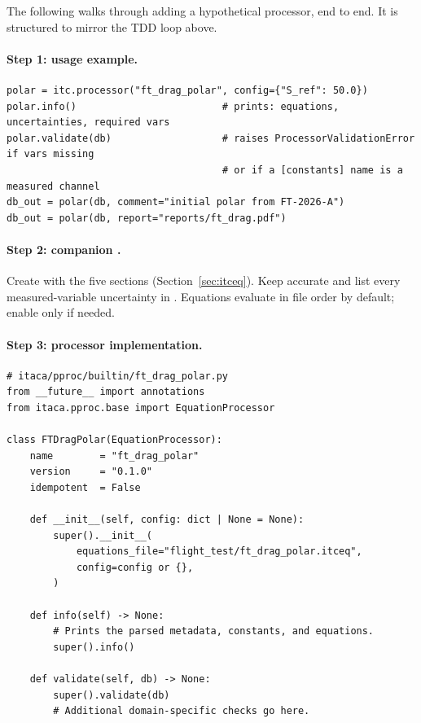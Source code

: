 The following walks through adding a hypothetical
 processor, end to end. It is structured to mirror
the TDD loop above.

\paragraph{Step 1: usage example.}
\begin{lstlisting}
polar = itc.processor("ft_drag_polar", config={"S_ref": 50.0})
polar.info()                         # prints: equations, uncertainties, required vars
polar.validate(db)                   # raises ProcessorValidationError if vars missing
                                     # or if a [constants] name is a measured channel
db_out = polar(db, comment="initial polar from FT-2026-A")
db_out = polar(db, report="reports/ft_drag.pdf")
\end{lstlisting}

\paragraph{Step 2: companion .} Create
 with the
five sections (Section~\ref{sec:itceq}). Keep \code{[meta]} accurate and
list every measured-variable uncertainty in
\code{[uncertainties]}. Equations evaluate in file order by default;
enable  only if needed.

\paragraph{Step 3: processor implementation.}
\begin{lstlisting}
# itaca/pproc/builtin/ft_drag_polar.py
from __future__ import annotations
from itaca.pproc.base import EquationProcessor

class FTDragPolar(EquationProcessor):
    name        = "ft_drag_polar"
    version     = "0.1.0"
    idempotent  = False

    def __init__(self, config: dict | None = None):
        super().__init__(
            equations_file="flight_test/ft_drag_polar.itceq",
            config=config or {},
        )

    def info(self) -> None:
        # Prints the parsed metadata, constants, and equations.
        super().info()

    def validate(self, db) -> None:
        super().validate(db)
        # Additional domain-specific checks go here.
\end{lstlisting}

